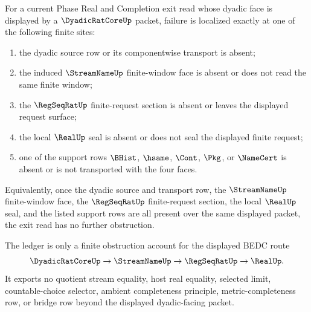 \begin{theorem}
\label{thm:dyadicratcore-real-completion-obstruction-ledger}
For a current Phase Real and Completion exit read whose dyadic face is displayed by a $\DyadicRatCoreUp$ packet, failure is localized exactly at one of the following finite sites:
\begin{enumerate}
\item the dyadic source row or its componentwise transport is absent;
\item the induced $\StreamNameUp$ finite-window face is absent or does not read the same finite window;
\item the $\RegSeqRatUp$ finite-request section is absent or leaves the displayed request surface;
\item the local $\RealUp$ seal is absent or does not seal the displayed finite request;
\item one of the support rows $\BHist$, $\hsame$, $\Cont$, $\Pkg$, or $\NameCert$ is absent or is not transported with the four faces.
\end{enumerate}
Equivalently, once the dyadic source and transport row, the $\StreamNameUp$ finite-window face, the $\RegSeqRatUp$ finite-request section, the local $\RealUp$ seal, and the listed support rows are all present over the same displayed packet, the exit read has no further obstruction.

The ledger is only a finite obstruction account for the displayed BEDC route
$$
\DyadicRatCoreUp \to \StreamNameUp \to \RegSeqRatUp \to \RealUp.
$$
It exports no quotient stream equality, host real equality, selected limit, countable-choice selector, ambient completeness principle, metric-completeness row, or bridge row beyond the displayed dyadic-facing packet.
\end{theorem}
